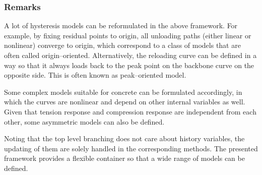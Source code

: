 \subsubsection{Remarks}
A lot of hysteresis models can be reformulated in the above framework. For example, by fixing residual points to origin, all unloading paths (either linear or nonlinear) converge to origin, which correspond to a class of models that are often called origin--oriented. Alternatively, the reloading curve can be defined in a way so that it always loads back to the peak point on the backbone curve on the opposite side. This is often known as peak--oriented model.

Some complex models suitable for concrete can be formulated accordingly, in which the curves are nonlinear and depend on other internal variables as well. Given that tension response and compression response are independent from each other, some asymmetric models can also be defined.

Noting that the top level branching does not care about history variables, the updating of them are solely handled in the corresponding methods. The presented framework provides a flexible container so that a wide range of models can be defined.

